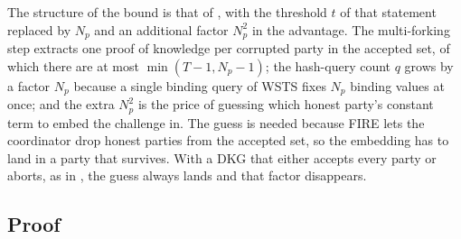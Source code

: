 \documentclass{article}
\theoremstyle{plain}
\theoremstyle{definition}
\theoremstyle{remark}
\begin{document}
The structure of the bound is that of \cite[Theorem~1]{cgrs23}, with the threshold $t$ of that statement replaced by $N_p$ and an additional factor $N_p^2$ in the advantage.  The multi-forking step extracts one proof of knowledge per corrupted party in the accepted set, of which there are at most $\min(T-1, N_p-1)$; the hash-query count $q$ grows by a factor $N_p$ because a single binding query of WSTS fixes $N_p$ binding values at once; and the extra $N_p^2$ is the price of guessing which honest party's constant term to embed the challenge in.  The guess is needed because FIRE lets the coordinator drop honest parties from the accepted set, so the embedding has to land in a party that survives.  With a DKG that either accepts every party or aborts, as in \cite{cgrs23}, the guess always lands and that factor disappears.

\subsection{
  Proof
}
\end{document}
